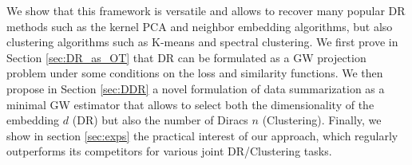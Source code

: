 We show that this framework is versatile and allows to recover many popular DR
methods such as the kernel PCA and neighbor embedding algorithms, but also clustering 
algorithms such as K-means and spectral clustering. We first prove in Section
\ref{sec:DR_as_OT} that DR can be formulated as a GW projection problem under
some conditions on the loss and similarity functions. We then propose in Section
\ref{sec:DDR} a novel formulation of data summarization as a minimal GW estimator that allows
to select both the dimensionality of the embedding $d$ (DR) but also the number of Diracs
$n$ (Clustering).
Finally, we show in section \ref{sec:exps} the practical interest of our approach, which regularly outperforms its competitors for various joint DR/Clustering tasks.



